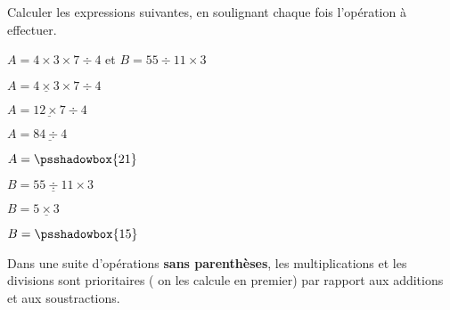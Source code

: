 \begin{exemple}
   Calculer les expressions suivantes, en soulignant chaque fois l'opération à effectuer.
   
   $A=4\times 3\times 7\div 4$ et $B=55\div 11\times 3$
   \correction
   
   \smallskip
   \begin{minipage}{0.5\linewidth}
      \begin{list}{}{}
               \item $A=\underline{4\times 3}\times 7\div 4$
               \item $A=\underline{12\times 7}\div 4$
               \item $A=\underline{84\div 4}$
               \item $A=\psshadowbox{21}$               
      \end{list}
   \end{minipage}      
   \begin{minipage}{0.5\linewidth}
      \begin{list}{}{}
         \item $B=\underline{55\div 11}\times 3$
         \item $B=\underline{5\times 3}$
         \item $B=\psshadowbox{15}$
      \end{list}
   \end{minipage}   
\end{exemple}

\begin{propriete}[\admise]
   Dans une suite d'opérations \textbf{sans parenthèses}, les multiplications et les divisions sont prioritaires ( on les calcule en premier) par rapport aux additions et aux soustractions.
\end{propriete}


